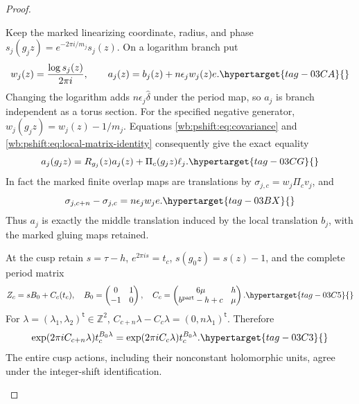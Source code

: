 \begin{proof}
\begin{enumerate}[label=\arabic*.,leftmargin=*]
Keep the marked linearizing coordinate, radius, and phase
$s_j(g_jz)=e^{-2\pi i/m_j}s_j(z)$. On a logarithm branch put
\begin{equation}
 w_j(z)=\frac{\log s_j(z)}{2\pi i},\qquad
 a_j(z)=b_j(z)+n\epsilon_j w_j(z)e.
 \hypertarget{tag-03CA}{}\label{wb:pshift:eq:finite-middle-sections}
\end{equation}
Changing the logarithm adds $n\epsilon_j\widehat\delta$ under the
period map, so $a_j$ is branch independent as a torus section.
For the specified negative generator, $w_j(g_jz)=w_j(z)-1/m_j$.
Equations \eqref{wb:pshift:eq:covariance} and \eqref{wb:pshift:eq:local-matrix-identity} consequently give the exact equality
\begin{equation}
 a_j(g_jz)=R_{g_j}(z)a_j(z)+\Pi_c(g_jz)\ell_j.
 \hypertarget{tag-03CG}{}\label{wb:pshift:eq:local-affine-cocycle}
\end{equation}
In fact the marked finite overlap maps are translations by
$\sigma_{j,c}=w_j\Pi_c v_j$, and
\begin{equation}
                  \sigma_{j,c+n}-\sigma_{j,c}
                     =n\epsilon_jw_je.
 \hypertarget{tag-03BX}{}\label{wb:pshift:eq:actual-overlap-difference}
\end{equation}
Thus $a_j$ is exactly the middle translation induced by the local
translation $b_j$, with the marked gluing maps retained.

At the cusp retain $s=\tau-h$, $e^{2\pi is}=t_c$, $s(g_0z)=s(z)-1$,
and the complete period matrix
\begin{equation}
 Z_c=sB_0+C_c(t_c),\quad
 B_0=\begin{pmatrix}0&1\\-1&0\end{pmatrix},\quad
 C_c=\begin{pmatrix}6\mu&h\\ b^{\mathrm{part}}-h+c&\mu\end{pmatrix}.
 \hypertarget{tag-03C5}{}\label{wb:pshift:eq:cusp-periods}
\end{equation}
For $\lambda=(\lambda_1,\lambda_2)^{\mathsf t}\in\mathbb Z^2$,
$C_{c+n}\lambda-C_c\lambda=(0,n\lambda_1)^{\mathsf t}$. Therefore
\begin{equation}
 \exp(2\pi iC_{c+n}\lambda)t_c^{B_0\lambda}
       =\exp(2\pi iC_c\lambda)t_c^{B_0\lambda}.
 \hypertarget{tag-03C3}{}\label{wb:pshift:eq:cusp-actions-identical}
\end{equation}
The entire cusp actions, including their nonconstant holomorphic units,
agree under the integer-shift identification.


\end{enumerate}
\end{proof}
